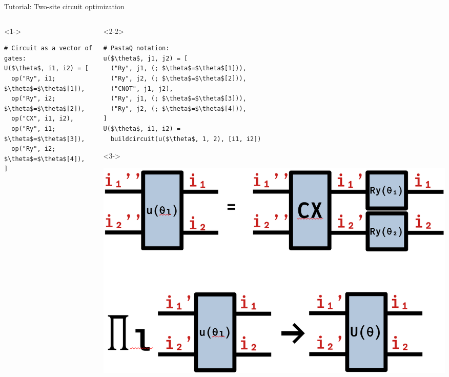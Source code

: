 \begin{frame}[fragile]{Tutorial: Two-site circuit optimization}

\begin{columns}

\begin{column}{5cm}

\begin{onlyenv}<1->
\begin{lstlisting}[language=JuliaLocal, style=julia, mathescape, basicstyle=\small]
# Circuit as a vector of gates:
U($\theta$, i1, i2) = [
  op("Ry", i1; $\theta$=$\theta$[1]),
  op("Ry", i2; $\theta$=$\theta$[2]),
  op("CX", i1, i2),
  op("Ry", i1; $\theta$=$\theta$[3]),
  op("Ry", i2; $\theta$=$\theta$[4]),
]


 \end{lstlisting}
\end{onlyenv}

\end{column}

\begin{column}{5cm}

\begin{onlyenv}<2-2>
\begin{lstlisting}[language=JuliaLocal, style=julia, numbers=none, mathescape, basicstyle=\small]
# PastaQ notation:
u($\theta$, j1, j2) = [
  ("Ry", j1, (; $\theta$=$\theta$[1])),
  ("Ry", j2, (; $\theta$=$\theta$[2])),
  ("CNOT", j1, j2),
  ("Ry", j1, (; $\theta$=$\theta$[3])),
  ("Ry", j2, (; $\theta$=$\theta$[4])),
]
U($\theta$, i1, i2) =
  buildcircuit(u($\theta$, 1, 2), [i1, i2])
\end{lstlisting}
\end{onlyenv}

\begin{onlyenv}<3->
\vspace*{0.0cm}
\begin{center}
\includegraphics[width=1.0\textwidth]{
  slides/assets/U12.png
}
\end{center}
\vspace*{0.0cm}
\end{onlyenv}

\end{column}

\end{columns}

\end{frame}

